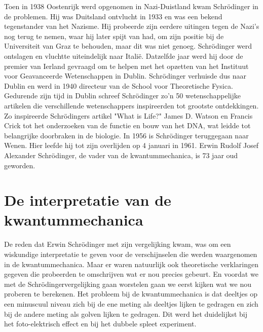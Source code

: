 \documentclass[11pt,fleqn]{book} %
\begin{document}
Toen in 1938 Oostenrijk werd opgenomen in Nazi-Duistland kwam Schrödinger in de problemen. Hij was Duitsland ontvlucht in 1933 en was een bekend tegenstander van het Nazisme. Hij probeerde zijn eerdere uitingen tegen de Nazi’s nog terug te nemen, waar hij later spijt van had, om zijn positie bij de Universiteit van Graz te behouden, maar dit was niet genoeg. Schrödinger werd ontslagen en vluchtte uiteindelijk naar Italië. Datzelfde jaar werd hij door de premier van Ierland gevraagd om te helpen met het opzetten van het Instituut voor Geavanceerde Wetenschappen in Dublin. Schrödinger verhuisde dus naar Dublin en werd in 1940 directeur van de School voor Theoretische Fysica. Gedurende zijn tijd in Dublin schreef Schrödinger zo’n 50 wetenschappelijke artikelen die verschillende wetenschappers inspireerden tot grootste ontdekkingen. Zo inspireerde Schrödingers artikel "What is Life?" James D. Watson en Francis Crick tot het onderzoeken van de functie en bouw van het DNA, wat leidde tot belangrijke doorbraken in de biologie.
In 1956 is Schrödinger teruggegaan naar Wenen. Hier leefde hij tot zijn overlijden op 4 januari in 1961. Erwin Rudolf Josef Alexander Schrödinger, de vader van de kwantummechanica, is 73 jaar oud geworden.

\section{De interpretatie van de kwantummechanica}
De reden dat Erwin Schrödinger met zijn vergelijking kwam, was om een wiskundige interpretatie te geven voor de verschijnselen die werden waargenomen in de kwantummechanica. Maar er waren natuurlijk ook theoretische verklaringen gegeven die probeerden te omschrijven wat er nou precies gebeurt. En voordat we met de Schrödingervergelijking gaan worstelen gaan we eerst kijken wat we nou proberen te berekenen.
Het probleem bij de kwantummechanica is dat deeltjes op een minuscuul niveau zich bij de ene meting als deeltjes lijken te gedragen en zich bij de andere meting als golven lijken te gedragen. Dit werd het duidelijkst bij het foto-elektrisch effect en bij het dubbele spleet experiment.
\end{document}

